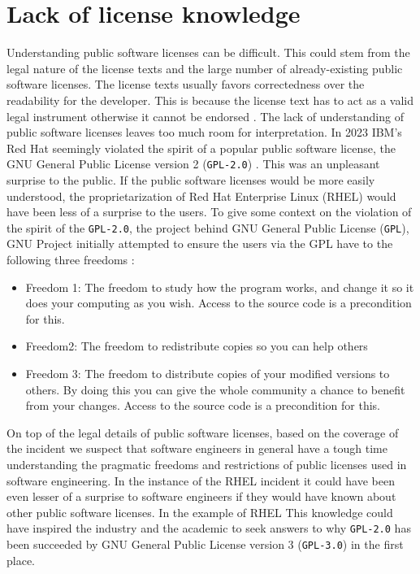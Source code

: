 \section{Lack of license knowledge}
Understanding public software licenses can be difficult. This could stem from the legal nature of the license texts and the large number of already-existing public software licenses. The license texts usually favors correctedness over the readability for the developer. This is because the license text has to act as a valid legal instrument otherwise it cannot be endorsed \citep{ferguson2006gpl}. The lack of understanding of public software licenses leaves too much room for interpretation. In 2023 IBM's Red Hat seemingly violated the spirit of a popular public software license, the GNU General Public License version 2 (\texttt{GPL-2.0}) \citep{ibm:rhel, sfc:rhel}. This was an unpleasant surprise to the public. If the public software licenses would be more easily understood, the proprietarization of Red Hat Enterprise Linux (RHEL) would have been less of a surprise to the users. To give some context on the violation of the spirit of the \texttt{GPL-2.0}, the project behind GNU General Public License (\texttt{GPL}), GNU Project initially attempted to ensure the users via the GPL have to the following three freedoms \citep{gnu:free}:
\begin{itemize}
	\item Freedom 1:	The freedom to study how the program works, and change it so it does your computing as you wish. Access to the source code is a precondition for this.
	\item Freedom2: The freedom to redistribute copies so you can help others
	\item Freedom 3:	The freedom to distribute copies of your modified versions to others. By doing this you can give the whole community a chance to benefit from your changes. Access to the source code is a precondition for this.
\end{itemize}

On top of the legal details of public software licenses, based on the coverage of the incident we suspect that software engineers in general have a tough time understanding the pragmatic freedoms and restrictions of public licenses used in software engineering. In the instance of the RHEL incident it could have been even lesser of a surprise to software engineers if they would have known about other public software licenses. In the example of RHEL This knowledge could have inspired the industry and the academic to seek answers to why \texttt{GPL-2.0} has been succeeded by GNU General Public License version 3 (\texttt{GPL-3.0}) in the first place.

